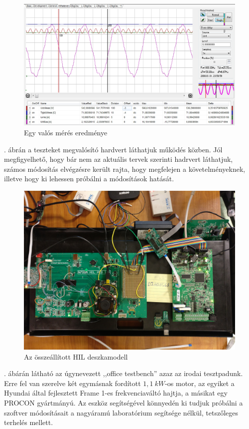 \begin{figure}[H]
	\centering
	\includegraphics[width = \textwidth]{figures/50Hz_400V_LD12A_10k.jpeg}
	\caption{Egy valós mérés eredménye} 
	\label{fig:meas_1}
\end{figure}

. ábrán a teszteket megvalósító hardvert láthatjuk működés közben. Jól megfigyelhető, hogy bár nem az aktuális tervek szerinti hadrvert láthatjuk, számos módosítás elvégzésre került rajta, hogy megfelejen a követelményeknek, illetve hogy ki lehessen próbálni a módosítások hatását.

\begin{figure}[H]
	\centering
	\includegraphics[width = \textwidth]{figures/hil_table.jpg}
	\caption{Az összeállított HIL deszkamodell} 
	\label{fig:hil_desk}
\end{figure}

. ábárán látható az úgynevezett ,,office testbench''
 azaz az irodai tesztpadunk. Erre fel van szerelve két egymásnak fordított $1,1\ kW$-os motor, az egyiket a Hyundai által fejlesztett Frame 1-es frekvenciaváltó hajtja, a másikat egy PROCON gyártmányú. Az eszköz segítségével könnyedén ki tudjuk próbálni a szoftver módosításait a nagyáramú laboratórium segítsége nélkül, tetszőleges terhelés mellett. 

